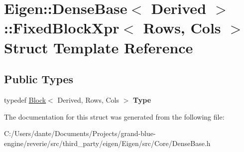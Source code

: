 \hypertarget{struct_eigen_1_1_dense_base_1_1_fixed_block_xpr}{}\section{Eigen\+::Dense\+Base$<$ Derived $>$\+::Fixed\+Block\+Xpr$<$ Rows, Cols $>$ Struct Template Reference}
\label{struct_eigen_1_1_dense_base_1_1_fixed_block_xpr}
\subsection*{Public Types}
\begin{DoxyCompactItemize}
\item 
\mbox{\label{struct_eigen_1_1_dense_base_1_1_fixed_block_xpr_a8ee33f171398a376aed84460e3a8cb96}} 
typedef \mbox{\hyperlink{class_eigen_1_1_block}{Block}}$<$ Derived, Rows, Cols $>$ {\bfseries Type}
\end{DoxyCompactItemize}


The documentation for this struct was generated from the following file\+:\begin{DoxyCompactItemize}
\item 
C\+:/\+Users/dante/\+Documents/\+Projects/grand-\/blue-\/engine/reverie/src/third\+\_\+party/eigen/\+Eigen/src/\+Core/Dense\+Base.\+h\end{DoxyCompactItemize}
